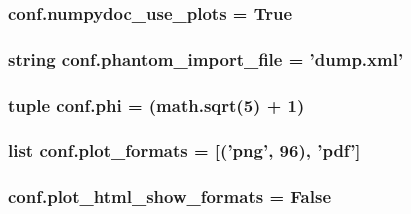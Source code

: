 \subsubsection[{numpydoc\+\_\+use\+\_\+plots}]{\setlength{\rightskip}{0pt plus 5cm}conf.\+numpydoc\+\_\+use\+\_\+plots = {\bf True}}\label{namespaceconf_a0b60d28b58b5b39a56f566734dec27bb}
\hypertarget{namespaceconf_ad772d138ab2c222323364557f70434f6}{}
\subsubsection[{phantom\+\_\+import\+\_\+file}]{\setlength{\rightskip}{0pt plus 5cm}string conf.\+phantom\+\_\+import\+\_\+file = 'dump.\+xml'}\label{namespaceconf_ad772d138ab2c222323364557f70434f6}
\hypertarget{namespaceconf_a4c4f89ad309f3e6b631369d9564d07e0}{}
\subsubsection[{phi}]{\setlength{\rightskip}{0pt plus 5cm}tuple conf.\+phi = ({\bf math.\+sqrt}(5) + 1)}\label{namespaceconf_a4c4f89ad309f3e6b631369d9564d07e0}
\hypertarget{namespaceconf_adbde6e4ba4ea4a0e49f91458929d4ec1}{}
\subsubsection[{plot\+\_\+formats}]{\setlength{\rightskip}{0pt plus 5cm}list conf.\+plot\+\_\+formats = \mbox{[}('png', 96), 'pdf'\mbox{]}}\label{namespaceconf_adbde6e4ba4ea4a0e49f91458929d4ec1}
\hypertarget{namespaceconf_ae9f2c59909a69f8f7f48c341909d3347}{}
\subsubsection[{plot\+\_\+html\+\_\+show\+\_\+formats}]{\setlength{\rightskip}{0pt plus 5cm}conf.\+plot\+\_\+html\+\_\+show\+\_\+formats = {\bf False}}\label{namespaceconf_ae9f2c59909a69f8f7f48c341909d3347}
\hypertarget{namespaceconf_a5e2e05a50752b8f166612fe843188c5d}{}
